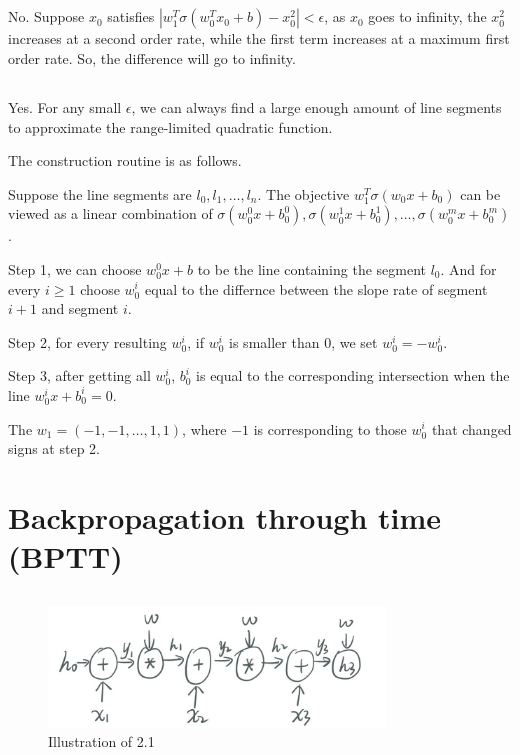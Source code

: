 \documentclass[12pt]{article}
\begin{document}
\subsection{}
No. Suppose $x_{0}$ satisfies $|w_1^T\sigma(w_0^T x_0 + b) - x_0^2| < \epsilon$, as $x_{0}$ goes to infinity, the $x_0^2$ increases at a second order rate, while the first term increases at a maximum first order rate. So, the difference will go to infinity.

\subsection{}
Yes. For any small $\epsilon$, we can always find a large enough amount of line segments to approximate the range-limited quadratic function. 

The construction routine is as follows.

Suppose the line segments are $l_0, l_1, \dots, l_n$. The objective $w_1^T \sigma(w_0 x + b_0)$ can be viewed as a linear combination of $\sigma(w_0^0 x + b_0^0), \sigma(w_0^1 x + b_0^1), \dots, \sigma(w_0^m x + b_0^m)$.

Step 1, we can choose $w_0^0 x + b$ to be the line containing the segment $l_0$. And for every $i \ge 1$ choose $w_0^i$ equal to the differnce between the slope rate of segment $i+1$ and segment $i$.

Step 2, for every resulting $w_0^i$, if $w_0^i$ is smaller than 0, we set $w_0^i = -w_0^i$.

Step 3, after getting all $w_0^i$, $b_0^i$ is equal to the corresponding intersection when the line $w_0^i x + b_0^i = 0$. 

The $w_1 = (-1, -1, \dots, 1, 1)$, where $-1$ is corresponding to those $w_0^i$ that changed signs at step 2.
\newpage

\section{Backpropagation through time (BPTT)}
\subsection{}
\begin{figure}[h]
    \centering
    \includegraphics[width=0.8\textwidth]{imgs/2-1.jpg}
    \caption{Illustration of 2.1}
    \label{fig:2-1}
\end{figure}
\end{document}
